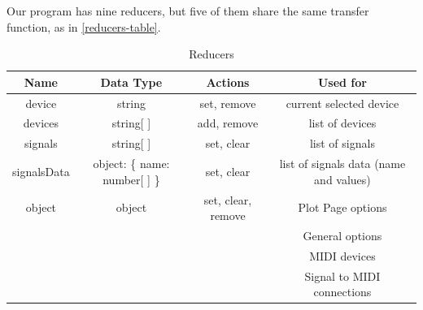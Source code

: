 Our program has nine reducers, but five of them share the same transfer function,
as in \autoref{reducers-table}.
\begin{table}[htb]
  \ABNTEXreducedfont
  \caption[Reducers]{Reducers}
  \label{reducers-table}
  \centering
  \begin{tabular}{c|c|c|c}
    \textbf{Name} & \textbf{Data Type} & \textbf{Actions} & \textbf{Used for} \\
		\hline \hline
		device & string & set, remove & current selected device \\
		\hline
		devices & string[ ] & add, remove & list of devices \\
		\hline
		signals & string[ ] & set, clear & list of signals \\
		\hline
		signalsData & object: \{ name: number[ ] \} & set, clear & list of signals data (name and values) \\
		\hline
		object & object & set, clear, remove & Plot Page options \\
																					& & & General options \\
																					& & & MIDI devices \\
																					& & & Signal to MIDI connections \\

  \end{tabular}
\end{table}


